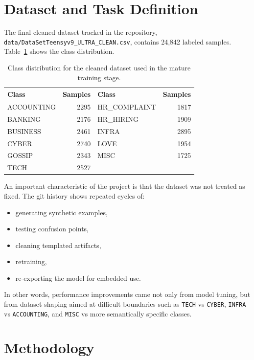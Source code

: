 \documentclass[11pt,a4paper]{article}
\begin{document}
\section{Dataset and Task Definition}

The final cleaned dataset tracked in the repository, \texttt{data/DataSetTeensyv9\_ULTRA\_CLEAN.csv}, contains 24{,}842 labeled samples. Table~\ref{tab:dataset} shows the class distribution.

\begin{table}[h]
\centering
\begin{tabular}{lr|lr}
\toprule
Class & Samples & Class & Samples \\
\midrule
ACCOUNTING & 2295 & HR\_COMPLAINT & 1817 \\
BANKING & 2176 & HR\_HIRING & 1909 \\
BUSINESS & 2461 & INFRA & 2895 \\
CYBER & 2740 & LOVE & 1954 \\
GOSSIP & 2343 & MISC & 1725 \\
TECH & 2527 & & \\
\bottomrule
\end{tabular}
\caption{Class distribution for the cleaned dataset used in the mature training stage.}
\label{tab:dataset}
\end{table}

An important characteristic of the project is that the dataset was not treated as fixed. The git history shows repeated cycles of:

\begin{itemize}
    \item generating synthetic examples,
    \item testing confusion points,
    \item cleaning templated artifacts,
    \item retraining,
    \item re-exporting the model for embedded use.
\end{itemize}

In other words, performance improvements came not only from model tuning, but from dataset shaping aimed at difficult boundaries such as \texttt{TECH} vs \texttt{CYBER}, \texttt{INFRA} vs \texttt{ACCOUNTING}, and \texttt{MISC} vs more semantically specific classes.

\section{Methodology}
\end{document}
